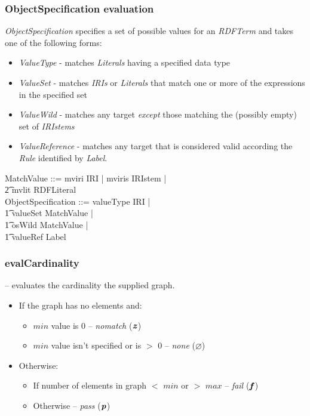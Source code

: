 \documentclass[fuzz]{llncs}
\def\pass{\textbf{\textit{p}}}
\def\fail{\textbf{\textit{f}}}
\def\none{\varnothing}
\def\nomatch{\textbf{\textit{z}}}
\def\zc{\textit}
\begin{document}
\subsubsection{ObjectSpecification evaluation}
\zc{ObjectSpecification} specifies a set of possible values for an \zc{RDFTerm} and takes one of the following forms:
\begin{itemize}
\item \zc{ValueType} - matches \zc{Literals} having a specified data type
\item \zc{ValueSet} - matches \zc{IRIs} or \zc{Literals} that match one or more of the expressions in the specified set
\item \zc{ValueWild} - matches any target \emph{except} those matching the (possibly empty) set of \zc{IRIstems}
\item \zc{ValueReference} - matches any target that is considered valid according the \zc{Rule} identified by \zc{Label}.
\end{itemize}
\begin{zed}
MatchValue ::= mviri \ldata IRI \rdata | mviris \ldata IRIstem \rdata | \\
\t2 mvlit \ldata RDFLiteral \rdata \\
ObjectSpecification ::= valueType \ldata IRI \rdata | \\
\t1 valueSet \ldata \power MatchValue \rdata | \\
\t1 osWild \ldata \power MatchValue \rdata | \\
\t1 valueRef \ldata Label \rdata
\end{zed}

\subsubsection{evalCardinality} -- evaluates the cardinality the supplied graph. 
\begin{itemize}
\item If the graph has no elements and:
\begin{itemize}
\item $min$ value is 0 -- \zc{nomatch} ($\nomatch$)
\item $min$ value isn't specified or is $>$ 0 -- \zc{none} ($\none$)
\end{itemize}
\item Otherwise:
\begin{itemize}
\item If number of elements in graph $<$ $min$ or $>$ $max$ -- \zc{fail} ($\fail$)
\item Otherwise -- \zc{pass} ($\pass$)
\end{itemize}
\end{itemize}
\end{document}
